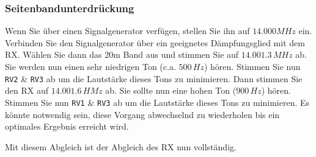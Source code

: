 \documentclass[10pt, a4paper,twoside]{scrartcl}
\begin{document}
\subsubsection{Seitenbandunterdrückung}
Wenn Sie über einen Signalgenerator verfügen, stellen Sie ihn auf $14.000 MHz$ ein. Verbinden Sie den Signalgenerator über ein geeignetes Dämpfungsglied mit dem RX. Wählen Sie dann das 20m Band aus und stimmen Sie auf $14.001.3\,MHz$ ab. Sie werden nun einen sehr niedrigen Ton (c.a. $500\,Hz$) hören. Stimmen Sie nun \texttt{RV2} \& \texttt{RV3} ab um die Lautstärke dieses Tons zu minimieren. Dann stimmen Sie den RX auf $14.001.6\,HMz$ ab. Sie sollte nun eine hohen Ton ($900\,Hz$) hören. Stimmen Sie nun \texttt{RV1} \& \texttt{RV3} ab um die Lautstärke dieses Tons zu minimieren. Es könnte notwendig sein, diese Vorgang abwechselnd zu wiederholen bis ein optimales Ergebnis erreicht wird.

Mit diesem Abgleich ist der Abgleich des RX nun vollständig. 

\clearpage
\end{document}
